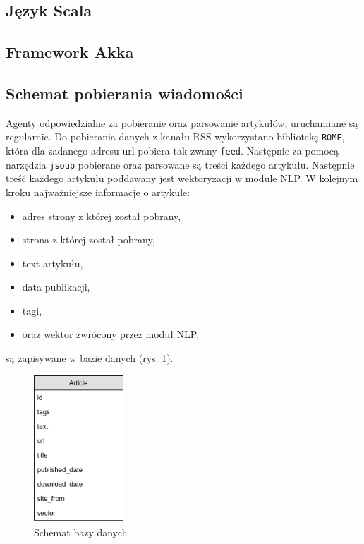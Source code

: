 \subsection{Język Scala}

\subsection{Framework Akka}

\subsection{Schemat pobierania wiadomości}

Agenty odpowiedzialne za pobieranie oraz parsowanie artykułów, uruchamiane są 
regularnie.
Do pobierania danych z kanału RSS wykorzystano bibliotekę 
\texttt{ROME}, która dla zadanego adresu url pobiera tak zwany \texttt{feed}. Następnie za pomocą narzędzia \texttt{jsoup} 
pobierane oraz parsowane są treści każdego artykułu. 
Następnie treść każdego artykułu poddawany jest wektoryzacji w module NLP. W kolejnym kroku najważniejsze informacje o artykule:
\begin{itemize}
\item adres strony z której został pobrany,
\item strona z której został pobrany,
\item text artykułu,
\item data publikacji,
\item tagi,
\item oraz wektor zwrócony przez moduł NLP,
\end{itemize}
są zapisywane w bazie danych (rys. \ref{fig:db}).

\begin{figure}[ht!]
\centering
\includegraphics[height=0.3\textheight, width=0.3\textwidth]{./pict/db.png}
\caption{Schemat bazy danych}
\label{fig:db}
\end{figure}